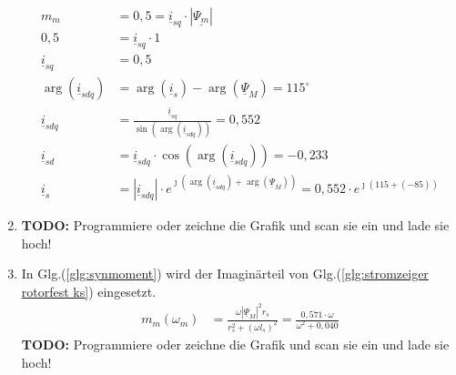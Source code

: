 \begin{solution}
\begin{enumerate}
\begin{align}
m_m &= 0,5 = \underline{i}_{sq} \cdot |\underline{\Psi_m}|\\
0,5 &= \underline{i}_{sq} \cdot 1\\
\underline{i}_{sq} &= 0,5\\
\arg(\underline{i}_{sdq}) &= \arg(\underline{i}_{s}) -\arg(\underline{\Psi}_{M})=115^\circ\\
\underline{i}_{sdq} &= \frac{\underline{i}_{sq}}{\sin(\arg(\underline{i}_{sdq}))}= 0,552\\
\underline{i}_{sd} &= \underline{i}_{sdq} \cdot \cos(\arg(\underline{i}_{sdq})) = -0,233\\
\underline{i}_{s} &= |\underline{i}_{sdq}| \cdot e^{\jmath (\arg(\underline{i}_{sdq}) + \arg(\underline{\Psi}_{M}))}= 0,552 \cdot e^{\jmath ( 115 + (-85))}
\end{align}
\item \textbf{TODO:} Programmiere oder zeichne die Grafik und scan sie ein und lade sie hoch!
\item In Glg.(\ref{glg:synmoment}) wird der Imaginärteil von Glg.(\ref{glg:stromzeiger rotorfest ks}) eingesetzt.
\begin{align}
m_m(\omega_m) &= \frac{\omega |\underline{\Psi}_M|^2 r_s}{r_s^2 + (\omega l_s)^2}=\frac{0,571 \cdot \omega}{\omega^2 + 0,040}
\end{align}
\textbf{TODO:} Programmiere oder zeichne die Grafik und scan sie ein und lade sie hoch!
\end{enumerate}
\end{solution}